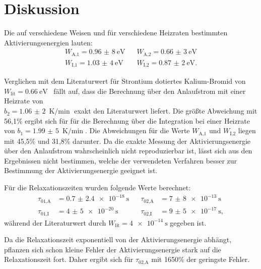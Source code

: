 \section{Diskussion}
Die auf verschiedene Weisen und für verschiedene Heizraten bestimmten Aktivierungsenergien lauten:
\begin{align*}
  W_\text{A,1}=\SI{0,96(8)}{\eV}\;\;\;&W_\text{A,2}=\SI{0,66(3)}{\eV}\\
  W_\text{I,1}=\SI{1,03(4)}{\eV}\;\;\;&W_\text{I,2}=\SI{0,87(2)}{\eV}.
\end{align*}

Verglichen mit dem Literaturwert für Strontium dotiertes
Kalium-Bromid von ${W_\text{lit}=\SI{0,66}{\eV} }$~\cite{literaturwert}
fällt auf, dass die Berechnung über den Anlaufstrom mit einer Heizrate von \\
${b_2=\SI{1,06(2)}{\K\per\min}}$
exakt den Literaturwert liefert. Die größte Abweichung mit 56,1\% ergibt sich für für die Berechnung über die
Integration bei einer Heizrate von ${b_1=\SI{1,99(5)}{\K\per\min}}$. Die Abweichungen für die Werte $W_\text{A,1}$
und $W_\text{I,2}$ liegen mit 45,5\% und 31,8\% darunter. Da die exakte Messung der Aktivierungsenergie
über den Anlaufstrom wahrscheinlich nicht reproduzierbar ist, lässt sich aus den Ergebnissen nicht bestimmen,
welche der verwendeten Verfahren besser zur Bestimmung der Aktivierungsenergie geeignet ist.


Für die Relaxationszeiten wurden folgende Werte berechnet:
\begin{align*}
  \tau_\text{01,A}&=\SI{0.7(24)e-18}{\s}\;\;\;&\tau_\text{02,A}&=\SI{7(8)e-13}{\s}\\
  \tau_\text{01,I}&=\SI{4(5)e-20}{\s}\;\;\;&\tau_\text{02,I}&=\SI{9(5)e-17}{\s},
\end{align*}
während der Literaturwert durch $W_\text{lit}=\SI{4e-14}{\s}$ \cite{literaturwert}
gegeben ist.

Da die Relaxationszeit exponentiell von der Aktivierungsenergie abhängt, pflanzen sich schon kleine Fehler
der Aktivierungsenergie stark auf die Relaxationszeit fort.
Daher ergibt sich für $\tau_\text{02,A}$ mit 1650\% der geringste Fehler.

